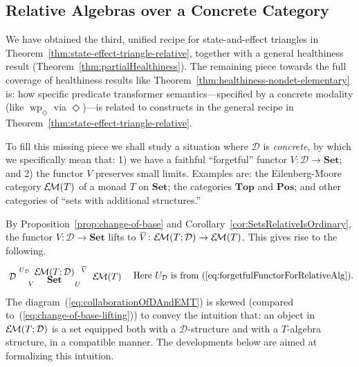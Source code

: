 \documentclass[9pt, preprint]{sigplanconf}
\theoremstyle{theorem}
\theoremstyle{definition}
\newcommand{\cat}[1]{\mathcal{#1}}
\renewcommand{\bar}{\overbar}
\newcommand{\overbar}[1]{\mkern 1.5mu\overline{\mkern-1.5mu#1\mkern-1.5mu}\mkern 1.5mu}
\newcommand{\Set}{\mathbf{Set}}
\newcommand{\Sets}{\Set}
\newcommand{\Pos}{\mathbf{Pos}}
\newcommand{\Top}{\mathbf{Top}}
\newcommand{\EM}{\mathcal{E}{\kern-.5ex}\mathcal{M}}
\newcommand{\wpre}{\mathop{\mathrm{wp}}\nolimits}
\begin{document}
\subsection{Relative Algebras over a Concrete Category}
\label{subsec:relative-alg-concrete}
We have obtained the third, unified recipe for state-and-effect
triangles in Theorem~\ref{thm:state-effect-triangle-relative}, together
with a general healthiness result
(Theorem~\ref{thm:partialHealthiness}). The remaining piece towards the
full coverage of healthiness results like
Theorem~\ref{thm:healthiness-nondet-elementary} is: how specific predicate
transformer semantics---specified by a concrete modality (like
$\wpre_{\Diamond}$ via $\Diamond$)---is related to constructs in the
general recipe in Theorem~\ref{thm:state-effect-triangle-relative}.

To fill this missing piece we shall study
a situation where $\cat{D}$ is \emph{concrete},
by which we specifically mean that: 1) we have a faithful ``forgetful''
functor $V \colon \cat{D} \to \Set$; and 2) the functor $V$ preserves
small limits. Examples are: the Eilenberg-Moore category $\EM(T)$ of a monad $T$
on $\Sets$; the categories $\Top$ and $\Pos$; and other categories of
 ``sets with additional
structures.''



By  Proposition~\ref{prop:change-of-base} and
Corollary~\ref{cor:SetsRelativeIsOrdinary},
the functor $V \colon \cat{D} \to \Set$ lifts
to $\bar{V} \colon \EM(T; \cat{D}) \to \EM(T)$.
This gives rise to the following.
\begin{equation}\label{eq:collaborationOfDAndEMT}
\vcenter{  \xymatrix@R-3.5em@C-1em{
    & \EM(T; \cat{D}) \ar[ld]_-{U_{\cat{D}}}
          \ar[rd]^-{\bar{V}} \\
    \cat{D} \ar[rd]_-{V}
    && \EM(T) \ar[ld]^-{U} \\
    & \Set
  }
}
\quad\text{Here $U_{\cat{D}}$ is from~(\ref{eq:forgetfulFunctorForRelativeAlg}).}
\end{equation}
The diagram~(\ref{eq:collaborationOfDAndEMT}) is skewed (compared
    to~(\ref{eq:change-of-base-lifting})) to convey the intuition that:
an object in $\EM(T; \cat{D})$ is a set equipped both with a
    $\cat{D}$-structure
and with a $T$-algebra structure, in a compatible manner.
The developments below are aimed at formalizing this intuition.
\end{document}
